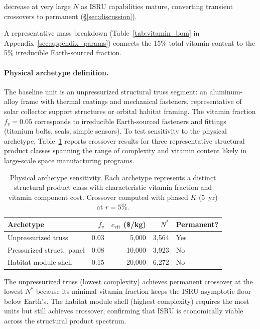 \documentclass[preprint,12pt]{elsarticle}
\begin{document}
decrease at very large $N$ as ISRU capabilities mature, converting transient crossovers to permanent (\S\ref{sec:discussion}).

A representative mass breakdown (Table~\ref{tab:vitamin_bom} in Appendix~\ref{sec:appendix_params}) connects the 15\% total vitamin content to the 5\% irreducible Earth-sourced fraction.

\paragraph{Physical archetype definition.}
\label{sec:archetype}
The baseline unit is an unpressurized structural truss segment: an aluminum-alloy frame with thermal coatings and mechanical fasteners, representative of solar collector support structures or orbital habitat framing. The vitamin fraction $f_v = 0.05$ corresponds to irreducible Earth-sourced fasteners and fittings (titanium bolts, seals, simple sensors). To test sensitivity to the physical archetype, Table~\ref{tab:archetype_fv} reports crossover results for three representative structural product classes spanning the range of complexity and vitamin content likely in large-scale space manufacturing programs.

\begin{table}[htbp]
\centering
\caption{Physical archetype sensitivity. Each archetype represents a distinct structural product class with characteristic vitamin fraction and vitamin component cost. Crossover computed with phased $K$ (5~yr) at $r = 5\%$.}
\label{tab:archetype_fv}
\small
\begin{tabular}{@{}lrrrl@{}}
\toprule
Archetype & $f_v$ & $c_{\mathrm{vit}}$ (\$/kg) & $N^*$ & Permanent? \\
\midrule
Unpressurized truss      & 0.03 &  5{,}000 & 3{,}564 & Yes \\
Pressurized struct.\ panel & 0.08 & 10{,}000 & 3{,}923 & No \\
Habitat module shell      & 0.15 & 20{,}000 & 6{,}272 & No \\
\bottomrule
\end{tabular}
\end{table}

The unpressurized truss (lowest complexity) achieves permanent crossover at the lowest $N^*$ because its minimal vitamin fraction keeps the ISRU asymptotic floor below Earth's. The habitat module shell (highest complexity) requires the most units but still achieves crossover, confirming that ISRU is economically viable across the structural product spectrum.
\end{document}
